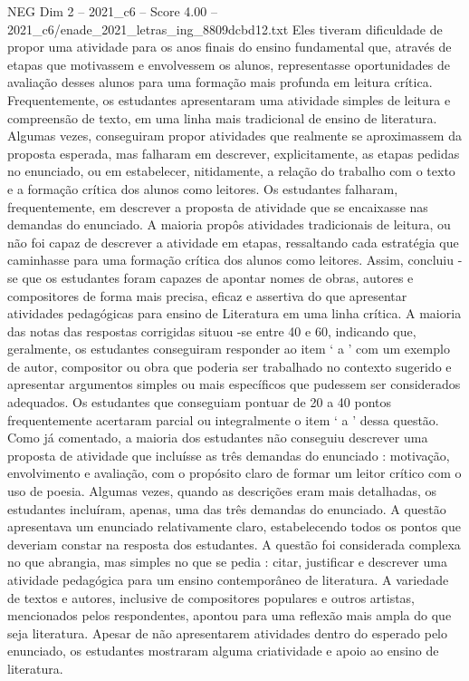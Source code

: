 \begin{textsample}{NEG Dim 2 – 2021\_c6 – Score 4.00 – 2021\_c6/enade\_2021\_letras\_ing\_8809dcbd12.txt}
Eles tiveram dificuldade de propor uma atividade para os anos finais do ensino fundamental que, através de etapas que motivassem e envolvessem os alunos, representasse oportunidades de avaliação desses alunos para uma formação mais profunda em leitura crítica.
Frequentemente, os estudantes apresentaram uma atividade simples de leitura e compreensão de texto, em uma linha mais tradicional de ensino de literatura.
Algumas vezes, conseguiram propor atividades que realmente se aproximassem da proposta esperada, mas falharam em descrever, explicitamente, as etapas pedidas no enunciado, ou em estabelecer, nitidamente, a relação do trabalho com o texto e a formação crítica dos alunos como leitores.
Os estudantes falharam, frequentemente, em descrever a proposta de atividade que se encaixasse nas demandas do enunciado.
A maioria propôs atividades tradicionais de leitura, ou não foi capaz de descrever a atividade em etapas, ressaltando cada estratégia que caminhasse para uma formação crítica dos alunos como leitores.
Assim, concluiu -se que os estudantes foram capazes de apontar nomes de obras, autores e compositores de forma mais precisa, eficaz e assertiva do que apresentar atividades pedagógicas para ensino de Literatura em uma linha crítica.
A maioria das notas das respostas corrigidas situou -se entre 40 e 60, indicando que, geralmente, os estudantes conseguiram responder ao item ‘ a ’ com um exemplo de autor, compositor ou obra que poderia ser trabalhado no contexto sugerido e apresentar argumentos simples ou mais específicos que pudessem ser considerados adequados.
Os estudantes que conseguiam pontuar de 20 a 40 pontos frequentemente acertaram parcial ou integralmente o item ‘ a ’ dessa questão.
Como já comentado, a maioria dos estudantes não conseguiu descrever uma proposta de atividade que incluísse as três demandas do enunciado : motivação, envolvimento e avaliação, com o propósito claro de formar um leitor crítico com o uso de poesia.
Algumas vezes, quando as descrições eram mais detalhadas, os estudantes incluíram, apenas, uma das três demandas do enunciado.
A questão apresentava um enunciado relativamente claro, estabelecendo todos os pontos que deveriam constar na resposta dos estudantes.
A questão foi considerada complexa no que abrangia, mas simples no que se pedia : citar, justificar e descrever uma atividade pedagógica para um ensino contemporâneo de literatura.
A variedade de textos e autores, inclusive de compositores populares e outros artistas, mencionados pelos respondentes, apontou para uma reflexão mais ampla do que seja literatura.
Apesar de não apresentarem atividades dentro do esperado pelo enunciado, os estudantes mostraram alguma criatividade e apoio ao ensino de literatura.

\end{textsample}
